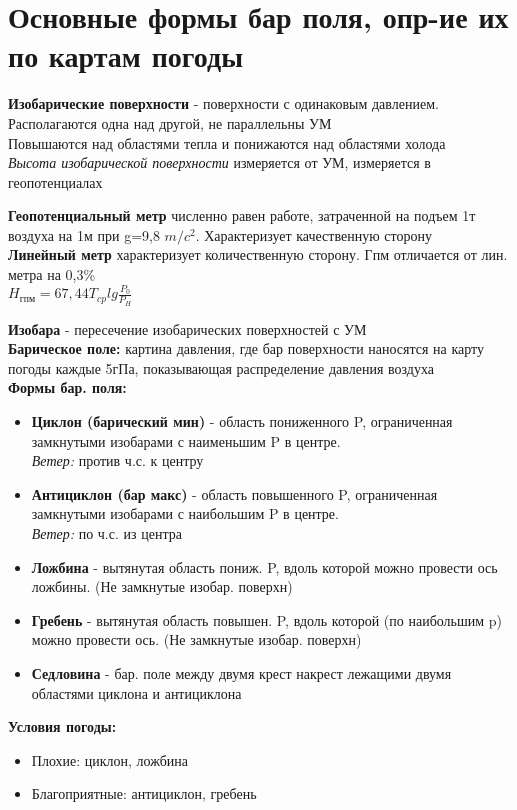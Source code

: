 
\section{Основные формы бар поля, опр-ие их по картам погоды}
\textbf{Изобарические поверхности} - поверхности с одинаковым давлением. Располагаются одна над другой, не параллельны УМ\\ 
Повышаются над областями тепла и понижаются над областями холода\\ 
\textit{Высота изобарической поверхности} измеряется от УМ, измеряется в геопотенциалах\\

\par \textbf{Геопотенциальный метр} численно равен работе, затраченной на подъем 1т воздуха на 1м при g=9,8 $m/c^2$. Характеризует качественную сторону\\ 
\textbf{Линейный метр} характеризует количественную сторону. 
Гпм отличается от лин. метра на 0,3\%\\ 
$H_{\text{гпм}}=67,44T_{cp}lg\frac{P_{0}}{P_{H}}$\\

\par \textbf{Изобара} - пересечение изобарических поверхностей с УМ\\
\textbf{Барическое поле:} картина давления, где бар поверхности наносятся на карту погоды каждые 5гПа, показывающая распределение давления воздуха\\
\textbf{Формы бар. поля:} 
\begin{itemize} 
	\item \textbf{Циклон (барический мин)} - область пониженного P, ограниченная замкнутыми изобарами с наименьшим P в центре.\\ 
	\textit{Ветер:} против ч.с. к центру
	\item \textbf{Антициклон (бар макс)} - область повышенного P, ограниченная замкнутыми изобарами с наибольшим P в центре.\\ 
	\textit{Ветер:} по ч.с. из центра 
	\item \textbf{Ложбина} - вытянутая область пониж. P, вдоль которой можно провести ось ложбины. (Не замкнутые изобар. поверхн) 
	\item \textbf{Гребень} - вытянутая область повышен. P, вдоль которой (по наибольшим p) можно провести ось. (Не замкнутые изобар. поверхн) 
	\item \textbf{Седловина} - бар. поле между двумя крест накрест лежащими двумя областями циклона и антициклона 
\end{itemize} 

\textbf{Условия погоды:} 
\begin{itemize} 
	\item[] Плохие: циклон, ложбина 
	\item[] Благоприятные: антициклон, гребень 
\end{itemize} 

